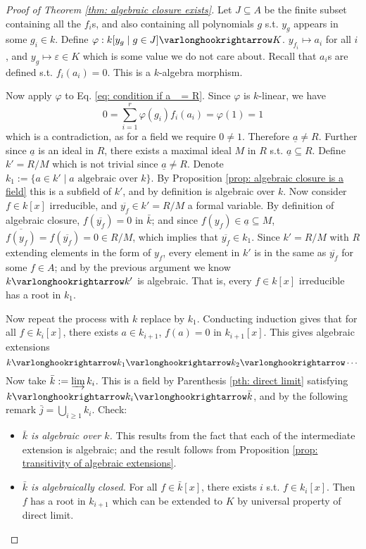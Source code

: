 \documentclass{article}
\begin{document}
\begin{proof}[Proof of Theorem \ref{thm: algebraic closure exists}]
    Let $J \subseteq A$ be the finite subset containing all the $f_i$s, and also containing all polynomials $g$ s.t. $y_g$ appears in some $g_i \in k$. Define $\varphi: k[y_g \mid g \in J] \ext K$. $y_{f_i} \mapsto a_i$ for all $i$, and $y_g \mapsto \varepsilon \in K$ which is some value we do not care about. Recall that $a_i$s are defined s.t. $f_i(a_i) = 0$. This is a $k$-algebra morphism. 
    
    Now apply $\varphi$ to Eq. \eqref{eq: condition if a_ = R}. Since $\varphi$ is $k$-linear, we have
    \[
        0 = \sum_{i = 1}^r \varphi(g_i) f_i(a_i) = \varphi(1) = 1
    \] 
    which is a contradiction, as for a field we require $0 \neq 1$. Therefore $\underline{a} \neq R$. Further since $\underline{a}$ is an ideal in $R$, there exists a maximal ideal $M$ in $R$ s.t. $\underline{a} \subseteq R$. Define $k' = R/M$ which is not trivial since $\underline{a} \neq R$. Denote $k_1 := \{ a \in k' \mid \text{$a$ algebraic over $k$} \}$. By Proposition \ref{prop: algebraic closure is a field} this is a subfield of $k'$, and by definition is algebraic over $k$. Now consider $f \in k[x]$ irreducible, and $\overline{y_f} \in k' = R/M$ a formal variable. By definition of algebraic closure, $f(\overline{y_f}) = 0$ in $\bar{k}$; and since $f(y_f) \in \underline{a} \subseteq M$, $\overline{f(y_f)} = f(\overline{y_f}) = 0 \in R/M$, which implies that $\overline{y_f} \in k_1$. Since $k' = R/M$ with $R$ extending elements in the form of $y_f$, every element in $k'$ is in the same as $\overline{y_f}$ for some $f \in A$; and by the previous argument we know $k \ext k'$ is algebraic. That is, every $f \in k[x]$ irreducible has a root in $k_1$.

    Now repeat the process with $k$ replace by $k_1$. Conducting induction gives that for all $f \in k_i[x]$, there exists $a \in k_{i + 1}$, $f(a) = 0$ in $k_{i+1}[x]$. This gives algebraic extensions
    \[
        k \ext k_1 \ext k_2 \ext \cdots
    \]
    Now take $\bar{k} := \varinjlim k_i$. This is a field by Parenthesis \ref{pth: direct limit} satisfying $k \ext k_i \ext \bar{k}$, and by the following remark $\bar{j} = \bigcup_{i \geq 1} k_i$. Check:
    \begin{itemize}
        \item \emph{$\bar{k}$ is algebraic over $k$.} This results from the fact that each of the intermediate extension is algebraic; and the result follows from Proposition \ref{prop: transitivity of algebraic extensions}.
        \item \emph{$\bar{k}$ is algebraically closed.} For all $f \in \bar{k}[x]$, there exists $i$ s.t. $f \in k_{i}[x]$. Then $f$ has a root in $k_{i + 1}$ which can be extended to $K$ by universal property of direct limit.  
    \end{itemize}
\end{proof}
\end{document}
